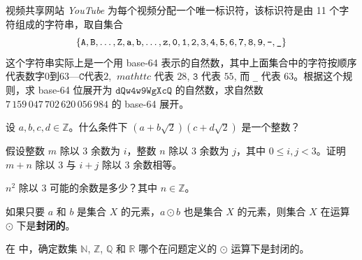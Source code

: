 \begin{chapex}
视频共享网站 \textit{YouTube} 为每个视频分配一个唯一标识符，该标识符是由 11 个字符组成的字符串，取自集合
\[ \{ \mathtt{A}, \mathtt{B}, \dots, \mathtt{Z}, \mathtt{a}, \mathtt{b}, \dots, \mathtt{z}, \mathtt{0}, \mathtt{1}, \mathtt{2}, \mathtt{3}, \mathtt{4}, \mathtt{5}, \mathtt{6}, \mathtt{7}, \mathtt{8}, \mathtt{9}, \text{\texttt{-}}, \text{\texttt{\_}} \} \]
这个字符串实际上是一个用 base-64 表示的自然数，其中上面集合中的字符按顺序代表数字$0$到$63$---$\mathtt{C}$代表$2$, $\ mathtt{c}$ 代表 $28$, $\mathtt{3}$ 代表 $55$, 而 \texttt{\_} 代表 $63$。根据这个规则，求 base-64 位展开为 $\mathtt{dQw4w9WgXcQ}$ 的自然数，求自然数 $7\,159\,047\,702\,620\,056\,984$ 的 base-64 展开。
\end{chapex}

\begin{chapex}
设 $a, b, c, d \in \mathbb{Z}$。什么条件下 $(a+b\sqrt{2})(c+d\sqrt{2})$ 是一个整数？
\end{chapex}

\begin{chapex}
假设整数 $m$ 除以 $3$ 余数为 $i$，整数 $n$ 除以 $3$ 余数为 $j$，其中 $0 \le i,j < 3$。证明 $m+n$ 除以 $3$ 与 $i+j$ 除以 $3$ 余数相等。
\end{chapex}

\begin{chapex}
$n^2$ 除以 $3$ 可能的余数是多少？其中 $n \in \mathbb{Z}$。
\end{chapex}

\begin{definition}
如果只要 $a$ 和 $b$ 是集合 $X$ 的元素，$a \odot b$ 也是集合 $X$ 的元素，则集合 $X$ 在运算 $\odot$ 下是\textbf{封闭的}。
\end{definition}

在  中，确定数集 $\mathbb{N}$, $\mathbb{Z}$, $\mathbb{Q}$ 和 $\mathbb{R}$ 哪个在问题定义的 $\odot$ 运算下是封闭的。

